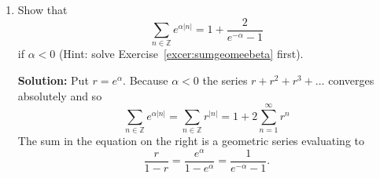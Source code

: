\documentclass[11pt,a4paper]{book}
\theoremstyle{plain}
\numberwithin{equation}{section}
\newcommand{\ints}{{\mathbb Z}}
\newcommand{\abs}[1]{\left\vert #1 \right\vert}
\newcommand{\sabs}[1]{\vert #1 \vert}
\newenvironment{solution}{\begin{footnotesize}\textbf{Solution:}}{\end{footnotesize}}
\newenvironment{excersizelist}{%
  \renewcommand*{\theenumi}{\thechapter.\arabic{enumi}}%
  \newcommand\itemadvanced{\stepcounter{enumi}\item[$\ast$\, \theenumi.]}
  \begin{enumerate}
}{%
  \end{enumerate}
}
\begin{document}
\begin{excersizelist}



\item \label{excer:sumgeomeabsn} Show that 
\[
\sum_{n \in \ints} e^{\alpha \sabs{n}} = 1 + \frac{2}{e^{-\alpha} - 1}
\]
if $\alpha < 0$ (Hint: solve Exercise~\ref{excer:sumgeomeebeta} first).
\begin{solution}
Put $r = e^\alpha$.  Because $\alpha < 0$ the series $r + r^2 + r^3 + \dots$ converges absolutely and so
\[
\sum_{n \in \ints} e^{\alpha \sabs{n}} = \sum_{n \in \ints} r^{\abs{n}} = 1 + 2 \sum_{n=1}^\infty r^n 
\]
The sum in the equation on the right is a geometric series evaluating to
\[
\frac{r}{1-r} = \frac{e^\alpha}{1-e^\alpha} = \frac{1}{e^{-\alpha}-1}. 
\]
\end{solution}



\end{excersizelist}
\end{document}
